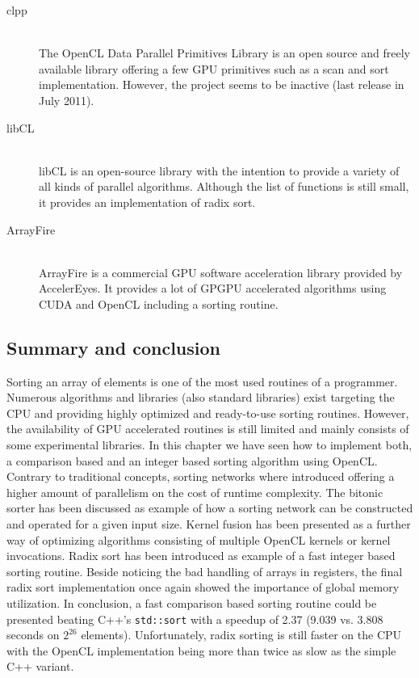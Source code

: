 \begin{description}
	\item[clpp \cite{clpp}] \hfill \\
	The OpenCL Data Parallel Primitives Library is an open source and freely available library offering a few GPU primitives such as a scan and sort implementation. However, the project seems to be inactive (last release in July 2011).
	\item[libCL \cite{libCL}] \hfill \\
	libCL is an open-source library with the intention to provide a variety of all kinds of parallel algorithms. Although the list of functions is still small, it provides an implementation of radix sort.
	\item[ArrayFire \cite{arrayfire}] \hfill \\
	ArrayFire is a commercial GPU software acceleration library provided by AccelerEyes. It provides a lot of GPGPU accelerated algorithms using CUDA and OpenCL including a sorting routine.
\end{description}

\subsection{Summary and conclusion}
Sorting an array of elements is one of the most used routines of a programmer. Numerous algorithms and libraries (also standard libraries) exist targeting the CPU and providing highly optimized and ready-to-use sorting routines. However, the availability of GPU accelerated routines is still limited and mainly consists of some experimental libraries. In this chapter we have seen how to implement both, a comparison based and an integer based sorting algorithm using OpenCL. Contrary to traditional concepts, sorting networks where introduced offering a higher amount of parallelism on the cost of runtime complexity. The bitonic sorter has been discussed as example of how a sorting network can be constructed and operated for a given input size. Kernel fusion has been presented as a further way of optimizing algorithms consisting of multiple OpenCL kernels or kernel invocations. Radix sort has been introduced as example of a fast integer based sorting routine. Beside noticing the bad handling of arrays in registers, the final radix sort implementation once again showed the importance of global memory utilization.
In conclusion, a fast comparison based sorting routine could be presented beating C++'s \lstinline!std::sort! with a speedup of 2.37 (9.039 vs. 3.808 seconds on $2^{26}$ elements). Unfortunately, radix sorting is still faster on the CPU with the OpenCL implementation being more than twice as slow as the simple C++ variant.
